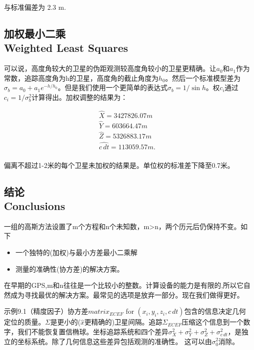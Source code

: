 		与标准偏差为 2.3 m.
	\subsection[加权最小二乘]{加权最小二乘\\Weighted Least Squares}
	可以说，高度角较大的卫星的伪距观测较高度角较小的卫星更精确。让$a_0$和$a_1$作为常数，追踪高度角为h的卫星，高度角的截止角度为$h_0$。然后一个标准模型差为$\sigma_b = a_0 + a_1e^{-h/h_0}$。但是我们使用一个更简单的表达式$\sigma_b=1/\sin h$。权$c_i$通过$c_i=1/\sigma^2_b$计算得出。加权调整的结果为：

		\[

		\begin{split}

			\hat{X} = 3427826.07 m \\

			\hat{Y} =  603664.47 m \\

			\hat{Z} = 5326883.17 m \\

			\hat{c\,dt} = 113059.57 m. \\

		\end{split}

		\]

	偏离不超过1-2米的每个卫星未加权的结果是。单位权的标准差下降至0.7米。


	\subsection[结论]{结论\\Conclusions}

	一组的高斯方法设置了m个方程和n个未知数，m>n，两个历元后仍保持不变。如下

		\begin{itemize}

			\item 一个独特的(加权)与最小方差最小二乘解

			\item 测量的准确性(协方差)的解决方案。

		\end{itemize}

	在早期的GPS,m和n往往是一个比较小的整数。计算设备的能力是有限的,所以它自然成为寻找最优的解决方案。最常见的选项是放弃一部分。现在我们做得更好。

	示例9.1（精度因子）协方差$matrix_{ECEF}$ for $(x_i,y_i,z_i,c\,dt)$包含的信息决定几何定位的质量。$\Sigma$是更小的($\hat{x}$更精确的)卫星间隔。追踪$\Sigma_{ECEF}$压缩这个信息到一个数字，我们不能恢复置信椭球。坐标追踪系统和四个差异$\sigma^2_X+\sigma^2_Y+\sigma^2_Z+\sigma^2_{c\,dt}$，是独立的坐标系统。除了几何信息这些差异包括观测的准确性。
这可以由$\sigma^2_0$消除。
	

